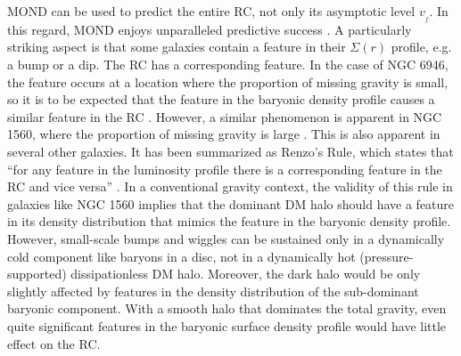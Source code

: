 \documentclass[fleqn,usenatbib,useAMS,onecolumn]{mnras} %
\begin{document}
MOND can be used to predict the entire RC, not only its asymptotic level $v_{_f}$. In this regard, MOND enjoys unparalleled predictive success \citep[extensively reviewed in][]{Famaey_McGaugh_2012}. A particularly striking aspect is that some galaxies contain a feature in their $\Sigma \left( r \right)$ profile, e.g. a bump or a dip. The RC has a corresponding feature. In the case of NGC 6946, the feature occurs at a location where the proportion of missing gravity is small, so it is to be expected that the feature in the baryonic density profile causes a similar feature in the RC \citep{McGaugh_2014}. However, a similar phenomenon is apparent in NGC 1560, where the proportion of missing gravity is large \citep{Gentile_2010}. This is also apparent in several other galaxies. It has been summarized as Renzo's Rule, which states that ``for any feature in the luminosity profile there is a corresponding feature in the RC and vice versa'' \citep{Sancisi_2004}. In a conventional gravity context, the validity of this rule in galaxies like NGC 1560 implies that the dominant DM halo should have a feature in its density distribution that mimics the feature in the baryonic density profile. However, small-scale bumps and wiggles can be sustained only in a dynamically cold component like baryons in a disc, not in a dynamically hot (pressure-supported) dissipationless DM halo. Moreover, the dark halo would be only slightly affected by features in the density distribution of the sub-dominant baryonic component. With a smooth halo that dominates the total gravity, even quite significant features in the baryonic surface density profile would have little effect on the RC.
\end{document}
